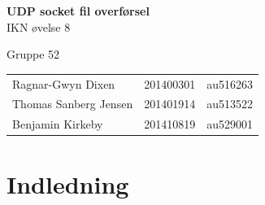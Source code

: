 \documentclass[12pt,fleqn,a4paper]{report}
\begin{document}
	

\begingroup
\thispagestyle{empty}
\centering
\vspace*{5cm}
\par\normalfont\fontsize{35}{35}\sffamily\selectfont
\textbf{UDP socket fil overførsel}\\
{\LARGE IKN øvelse 8}\par
{\LARGE Gruppe 52}\par
\vspace*{1cm}
{\small
\begin{center}
\begin{tabu} to 1 \textwidth { X[l,1]  X[c,1] X[c,1] }
	Ragnar-Gwyn Dixen & 201400301 & au516263\\
	Thomas Sanberg Jensen & 201401914 & au513522\\
	Benjamin Kirkeby & 201410819 & au529001\\
	\end{tabu}
\end{center}}
\endgroup
\newpage


\tableofcontents{}
\newpage

\chapter{Indledning}
\end{document}
